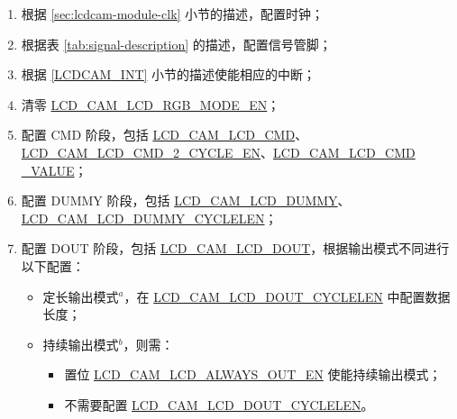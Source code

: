 \documentclass[main\_\_CN.tex]{subfiles}
\begin{document}
\begin{enumerate}
    \item 根据 \ref{sec:lcdcam-module-clk} 小节的描述，配置时钟；

    \item 根据表 \ref{tab:signal-description} 的描述，配置信号管脚；

    \item 根据 \ref{LCDCAM_INT} 小节的描述使能相应的中断；\label{LCDCAM-TX-INTERRUPT}

    \item 清零 \hyperref[fielddesc:LCDCAMLCDRGBMODEEN]{LCD\_CAM\_LCD\_RGB\_MODE\_EN}；
    \item 配置 CMD 阶段，包括 \hyperref[fielddesc:LCDCAMLCDCMD]{LCD\_CAM\_LCD\_CMD}、\hyperref[fielddesc:LCDCAMLCDCMD2CYCLEEN]{LCD\_CAM\_LCD\_CMD\_2\_CYCLE\_EN}、\hyperref[fielddesc:LCDCAMLCDCMDVALUE]{LCD\_CAM\_LCD\_CMD\\\_VALUE}；
    \item 配置 DUMMY 阶段，包括 \hyperref[fielddesc:LCDCAMLCDDUMMY]{LCD\_CAM\_LCD\_DUMMY}、\hyperref[fielddesc:LCDCAMLCDDUMMYCYCLELEN]{LCD\_CAM\_LCD\_DUMMY\_CYCLELEN}；
    \item 配置 DOUT 阶段，包括 \hyperref[fielddesc:LCDCAMLCDDOUT]{LCD\_CAM\_LCD\_DOUT}，根据输出模式不同进行以下配置：
\begin{itemize}
    \item 定长输出模式\hyperref[note-1]{$^a$}，在 \hyperref[fielddesc:LCDCAMLCDDOUTCYCLELEN]{LCD\_CAM\_LCD\_DOUT\_CYCLELEN} 中配置数据长度；
    \item 持续输出模式\hyperref[note-2]{$^b$}，则需：


    \begin{itemize}
        \item 置位 \hyperref[fielddesc:LCDCAMLCDALWAYSOUTEN]{LCD\_CAM\_LCD\_ALWAYS\_OUT\_EN} 使能持续输出模式；
        \item 不需要配置 \hyperref[fielddesc:LCDCAMLCDDOUTCYCLELEN]{LCD\_CAM\_LCD\_DOUT\_CYCLELEN}。
    \end{itemize}


\end{itemize}
\end{enumerate}
\end{document}
